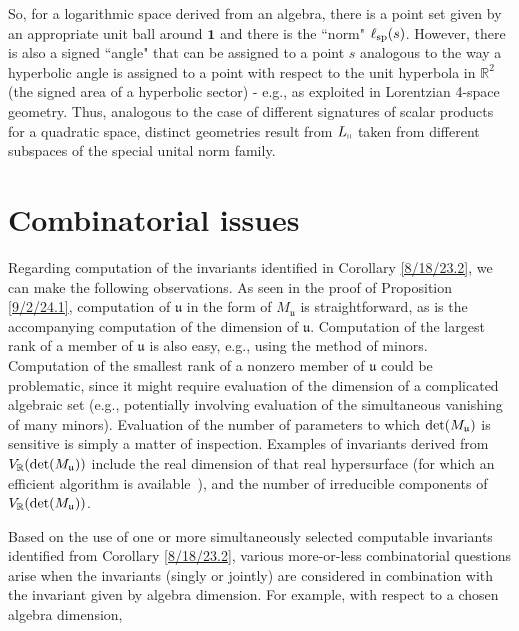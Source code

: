\documentclass{amsart}
\numberwithin{equation}{section}
\theoremstyle{definition}
\numberwithin{theorem}{section}
\begin{document}
So, for a logarithmic space derived from an algebra, there is a point set given by an appropriate unit ball around $\mathbf{1}$  and there is the ``norm" $\ell_{\rm sp}(s)$.  However, there is also a signed ``angle" that can be assigned to a point $s$ analogous to the way a hyperbolic angle is assigned to a point with respect to the unit hyperbola in $\mathbb{R}^2$ (the signed area of a hyperbolic sector) - e.g., as exploited in Lorentzian 4-space geometry.  Thus, analogous to the case of different signatures of scalar products for a quadratic space, distinct geometries result from $L_{\shortparallel}$ taken from different subspaces of the special unital norm family.



\section{Combinatorial issues}
Regarding computation of the invariants identified in Corollary \ref{8/18/23.2}, we can make the following observations.  As seen in the proof of Proposition \ref{9/2/24.1}, computation of $\mathfrak{u}$ in the form of $M_\mathfrak{u}$ is straightforward, as is the accompanying computation of the dimension of $\mathfrak{u}$.   Computation of the largest rank of a member of $\mathfrak{u}$ is also easy, e.g., using the method of minors.  Computation of the smallest rank of a nonzero member of $\mathfrak{u}$ could be problematic, since it might require evaluation of the dimension of a complicated algebraic set (e.g., potentially involving evaluation of the simultaneous vanishing of many minors).  Evaluation of the number of parameters to which ${\rm det}(M_{\mathfrak{u}})$ is sensitive is simply a matter of inspection.  Examples of invariants derived from $V_\mathbb{R}({\rm det}(M_{\mathfrak{u}}))$ include the real dimension of that real hypersurface (for which an efficient algorithm is \mbox{available \cite{bannwarth:2015})}, and the number of irreducible components of $V_\mathbb{R}({\rm det}(M_{\mathfrak{u}}))$.  

 
Based on the use of one or more simultaneously selected computable invariants identified from Corollary \ref{8/18/23.2}, various more-or-less combinatorial questions arise when the invariants (singly or jointly) are considered in combination with the invariant given by algebra dimension.  For example, with respect to a chosen algebra dimension,  
\end{document}
